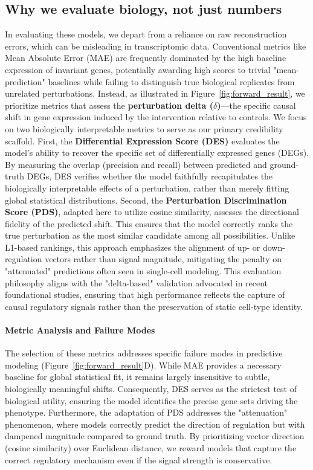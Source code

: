 \documentclass{article}
\begin{document}
\subsection{Why we evaluate biology, not just numbers}
In evaluating these models, we depart from a reliance on raw reconstruction errors, which can be misleading in transcriptomic data. Conventional metrics like Mean Absolute Error (MAE) are frequently dominated by the high baseline expression of invariant genes, potentially awarding high scores to trivial "mean-prediction" baselines while failing to distinguish true biological replicates from unrelated perturbations. Instead, as illustrated in Figure~\ref{fig:forward_result}, we prioritize metrics that assess the \textbf{perturbation delta ($\delta$)}—the specific causal shift in gene expression induced by the intervention relative to controls.
We focus on two biologically interpretable metrics to serve as our primary credibility scaffold. First, the \textbf{Differential Expression Score (DES)} evaluates the model’s ability to recover the specific set of differentially expressed genes (DEGs). By measuring the overlap (precision and recall) between predicted and ground-truth DEGs, DES verifies whether the model faithfully recapitulates the biologically interpretable effects of a perturbation, rather than merely fitting global statistical distributions. Second, the \textbf{Perturbation Discrimination Score (PDS)}, adapted here to utilize cosine similarity, assesses the directional fidelity of the predicted shift. This ensures that the model correctly ranks the true perturbation as the most similar candidate among all possibilities. Unlike L1-based rankings, this approach emphasizes the alignment of up- or down-regulation vectors rather than signal magnitude, mitigating the penalty on "attenuated" predictions often seen in single-cell modeling.
This evaluation philosophy aligns with the "delta-based" validation advocated in recent foundational studies, ensuring that high performance reflects the capture of causal regulatory signals rather than the preservation of static cell-type identity.
\paragraph{Metric Analysis and Failure Modes}
The selection of these metrics addresses specific failure modes in predictive modeling (Figure~\ref{fig:forward_result}D). While MAE provides a necessary baseline for global statistical fit, it remains largely insensitive to subtle, biologically meaningful shifts. Consequently, DES serves as the strictest test of biological utility, ensuring the model identifies the precise gene sets driving the phenotype. Furthermore, the adaptation of PDS addresses the "attenuation" phenomenon, where models correctly predict the direction of regulation but with dampened magnitude compared to ground truth. By prioritizing vector direction (cosine similarity) over Euclidean distance, we reward models that capture the correct regulatory mechanism even if the signal strength is conservative.
\end{document}
